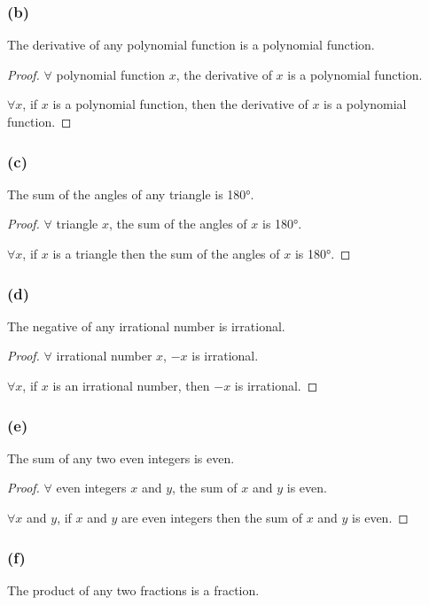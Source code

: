 \documentclass[14pt]{extarticle}
\newcommand{\fa}{\forall}
\begin{document}
\subsubsection{(b)}
The derivative of any polynomial function is a polynomial function.

\begin{proof}
    $\fa$ polynomial function $x$, the derivative of $x$ is a polynomial function.

    $\fa x$, if $x$ is a polynomial function, then the derivative of $x$ is a polynomial function.
\end{proof}

\subsubsection{(c)}
The sum of the angles of any triangle is 180°.

\begin{proof}
    $\fa$ triangle $x$, the sum of the angles of $x$ is 180°.

    $\fa x$, if $x$ is a triangle then the sum of the angles of $x$ is 180°.
\end{proof}

\subsubsection{(d)}
The negative of any irrational number is irrational.

\begin{proof}
    $\fa$ irrational number $x$, $-x$ is irrational.

    $\fa x$, if $x$ is an irrational number, then $-x$ is irrational.
\end{proof}

\subsubsection{(e)}
The sum of any two even integers is even.

\begin{proof}
    $\fa$ even integers $x$ and $y$, the sum of $x$ and $y$ is even.

    $\fa x$ and $y$, if $x$ and $y$ are even integers then the sum of $x$ and $y$ is even.
\end{proof}

\subsubsection{(f)}
The product of any two fractions is a fraction.
\end{document}
